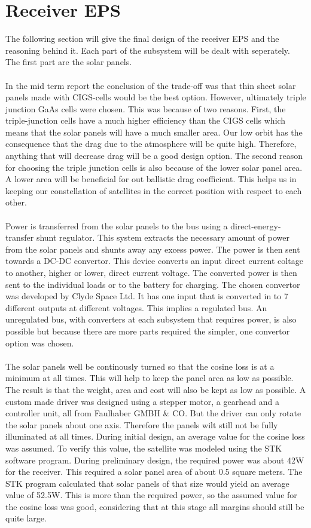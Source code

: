 \documentclass[11pt,a4paper,twoside]{book}
\begin{document}
\chapter{Receiver EPS}
\label{receiver_EPS}

The following section will give the final design of the receiver EPS and the reasoning behind it.
Each part of the subsystem will be dealt with seperately. The first part are the solar panels.
\\\\
In the mid term report the conclusion of the trade-off was that thin sheet solar panels made with CIGS-cells would be the best option. However, ultimately triple junction GaAs cells were chosen. This was because of two reasons. First, the triple-junction cells have a much higher efficiency than the CIGS cells which means that the solar panels will have a much smaller area. Our low orbit has the consequence that the drag due to the atmosphere will be quite high. Therefore, anything that will decrease drag will be a good design option. The second reason for choosing the triple junction cells is also because of the lower solar panel area. A lower area will be beneficial for out ballistic drag coefficient. This helps us in keeping our constellation of satellites in the correct position with respect to each other.
\\\\
Power is transferred from the solar panels to the bus using a direct-energy-transfer shunt regulator. This system extracts the necessary amount of power from the solar panels and shunts away any excess power. The power is then sent towards a DC-DC convertor. This device converts an input direct current coltage to another, higher or lower, direct current voltage. The converted power is then sent to the individual loads or to the battery for charging. The chosen convertor was developed by Clyde Space Ltd. It has one input that is converted in to 7 different outputs at different voltages. This implies a regulated bus. An unregulated bus, with converters at each subsystem that requires power, is also possible but because there are more parts required the simpler, one convertor option was chosen.
\\\\
The solar panels well be continously turned so that the cosine loss is at a minimum at all times. This will help to keep the panel area as low as possible. The result is that the weight, area and cost will also be kept as low as possible. A custom made driver was designed using a stepper motor, a gearhead and a controller unit, all from Faulhaber GMBH $\&$ CO. But the driver can only rotate the solar panels about one axis. Therefore the panels wilt still not be fully illuminated at all times. During initial design, an average value for the cosine loss was assumed. To verify this value, the satellite was modeled using the STK software program. During preliminary design, the required power was about 42W for the receiver. This required a solar panel area of about 0.5 square meters. The STK program calculated that solar panels of that size would yield an average value of 52.5W. This is more than the required power, so the assumed value for the cosine loss was good, considering that at this stage all margins should still be quite large.
\end{document}
